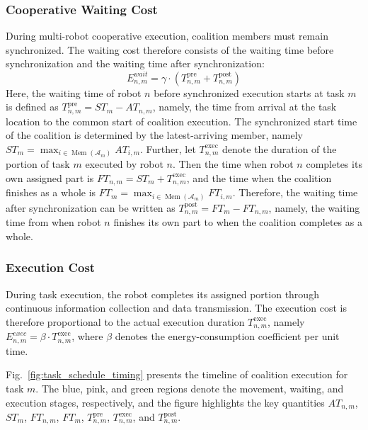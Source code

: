 \documentclass[journal,twoside,web]{ieeecolor}
\begin{document}
\subsubsection{Cooperative Waiting Cost}
During multi-robot cooperative execution, coalition members must remain synchronized. The waiting cost therefore consists of the waiting time before synchronization and the waiting time after synchronization:
\begin{equation}
E_{n,m}^{wait} = \gamma \cdot \left( T_{n,m}^{\mathrm{pre}} + T_{n,m}^{\mathrm{post}} \right)
\label{eq:cost_wait}
\end{equation}
Here, the waiting time of robot $n$ before synchronized execution starts at task $m$ is defined as $T_{n,m}^{\mathrm{pre}} = ST_m - AT_{n,m}$, namely, the time from arrival at the task location to the common start of coalition execution. The synchronized start time of the coalition is determined by the latest-arriving member, namely $ST_m = \max_{i \in \operatorname{Mem}(\mathcal{A}_m)} AT_{i,m}$. Further, let $T_{n,m}^{\mathrm{exec}}$ denote the duration of the portion of task $m$ executed by robot $n$. Then the time when robot $n$ completes its own assigned part is $FT_{n,m} = ST_m + T_{n,m}^{\mathrm{exec}}$, and the time when the coalition finishes as a whole is $FT_m = \max_{i \in \operatorname{Mem}(\mathcal{A}_m)} FT_{i,m}$. Therefore, the waiting time after synchronization can be written as $T_{n,m}^{\mathrm{post}} = FT_m - FT_{n,m}$, namely, the waiting time from when robot $n$ finishes its own part to when the coalition completes as a whole.

\subsubsection{Execution Cost}
During task execution, the robot completes its assigned portion through continuous information collection and data transmission. The execution cost is therefore proportional to the actual execution duration $T_{n,m}^{\mathrm{exec}}$, namely $E_{n,m}^{exec} = \beta \cdot T_{n,m}^{\mathrm{exec}}$, where $\beta$ denotes the energy-consumption coefficient per unit time.

Fig.~\ref{fig:task_schedule_timing} presents the timeline of coalition execution for task $m$. The blue, pink, and green regions denote the movement, waiting, and execution stages, respectively, and the figure highlights the key quantities $AT_{n,m}$, $ST_m$, $FT_{n,m}$, $FT_m$, $T_{n,m}^{\mathrm{pre}}$, $T_{n,m}^{\mathrm{exec}}$, and $T_{n,m}^{\mathrm{post}}$.
\end{document}
